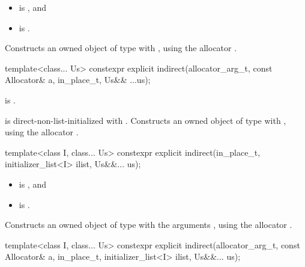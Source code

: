 \begin{itemdescr}
\pnum
\constraints
\begin{itemize}
\item
{} is , and
\item
{} is .
\end{itemize}

\pnum
\effects
Constructs an owned object of type  with
,
using the allocator .
\end{itemdescr}

%
\begin{itemdecl}
template<class... Us>
  constexpr explicit indirect(allocator_arg_t, const Allocator& a,
                              in_place_t, Us&& ...us);
\end{itemdecl}

\begin{itemdescr}
\pnum
\constraints
{} is .

\pnum
\effects
{} is direct-non-list-initialized with .
Constructs an owned object of type  with
,
using the allocator .
\end{itemdescr}

%
\begin{itemdecl}
template<class I, class... Us>
  constexpr explicit indirect(in_place_t, initializer_list<I> ilist, Us&&... us);
\end{itemdecl}

\begin{itemdescr}
\pnum
\constraints
\begin{itemize}
\item
{} is , and
\item
{} is .
\end{itemize}

\pnum
\effects
Constructs an owned object of type  with the arguments
,
using the allocator .
\end{itemdescr}

%
\begin{itemdecl}
template<class I, class... Us>
  constexpr explicit indirect(allocator_arg_t, const Allocator& a,
                              in_place_t, initializer_list<I> ilist, Us&&... us);
\end{itemdecl}

